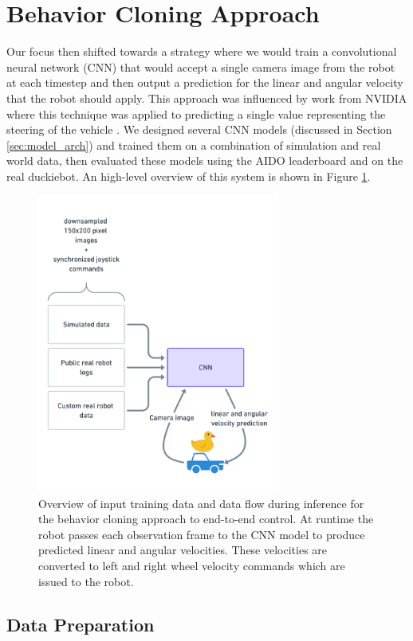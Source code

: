 \documentclass{article}
\begin{document}
\section{Behavior Cloning Approach}

Our focus then shifted towards a strategy where we would train a convolutional neural network (CNN) that would accept a single camera image from the robot at each timestep and then output a prediction for the linear and angular velocity that the robot should apply. This approach was influenced by work from NVIDIA where this technique was applied to predicting a single value representing the steering of the vehicle \cite{DBLP:journals/corr/BojarskiTDFFGJM16}. We designed several CNN models (discussed in Section \ref{sec:model_arch}) and trained them on a combination of simulation and real world data, then evaluated these models using the AIDO leaderboard and on the real duckiebot. An high-level overview of this system is shown in Figure \ref{fig:cnn_overview}.

\begin{figure}
\includegraphics[width=8cm,keepaspectratio]{cnn_overview}
\centering
\caption{Overview of input training data and data flow during inference for the behavior cloning approach to end-to-end control. At runtime the robot passes each observation frame to the CNN model to produce predicted linear and angular velocities. These velocities are converted to left and right wheel velocity commands which are issued to the robot.}
\label{fig:cnn_overview}
\end{figure}

\subsection{Data Preparation}
\end{document}
